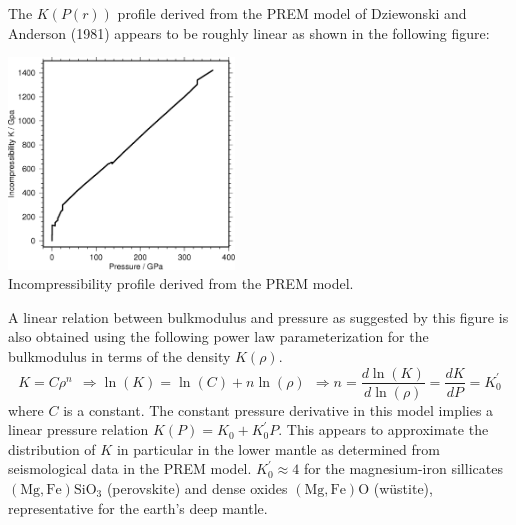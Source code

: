 The $K(P(r))$ profile derived from the PREM model of 
Dziewonski and Anderson (1981) appears to be roughly linear as shown
in the following figure: 

\begin{center}
\includegraphics[width=6cm]{images/gravity/pressure_incompress}\\
{\captionfont Incompressibility profile derived from the PREM model.}
\end{center}

A linear relation between bulkmodulus and pressure as suggested
by this figure is also obtained
using the following
power law parameterization for the bulkmodulus in terms of the
density $K(\rho)$.
\begin{equation}
K = C \rho^n
~~ \Rightarrow
\ln(K) = \ln(C) + n\ln(\rho) 
~~ \Rightarrow
n = \frac{d \ln (K)}{d \ln (\rho)} =  \frac{dK}{dP} = K_0^{'}
\label{K-rho}
\end{equation}
where $C$ is a constant.
The constant pressure derivative in this model 
implies a linear pressure relation $K(P)=K_0 + K_0^{'}P$.
This appears to approximate the distribution of $K$ in particular in the
lower mantle as determined from seismological data in the PREM model. 
$K_0^{'} \approx 4$ for the magnesium-iron sillicates 
$\mathrm{(Mg,Fe)SiO_3}$ (perovskite)
and dense oxides $\mathrm{(Mg,Fe)O}$ (w\"{u}stite),
representative for 
the earth's deep mantle.

